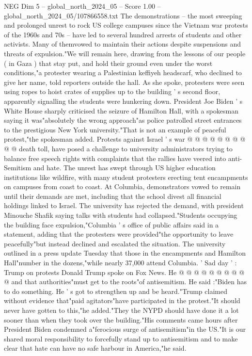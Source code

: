 \begin{textsample}{NEG Dim 5 – global\_north\_2024\_05 – Score 1.00 – global\_north\_2024\_05/107866558.txt}  \label{ex:f5_neg_285}
The demonstrations -- the most sweeping and prolonged unrest to rock US college campuses since the Vietnam war protests of the 1960s and 70s -- have led to several hundred arrests of students and other activists.
Many of themvowed to maintain their actions despite suspensions and threats of expulsion."We will remain here, drawing from the lessons of our people ( in Gaza ) that stay put, and hold their ground even under the worst conditions,"a protester wearing a Palestinian keffiyeh headscarf, who declined to give her name, told reporters outside the hall.
As she spoke, protesters were seen using ropes to hoist crates of supplies up to the building ' s second floor, apparently signalling the students were hunkering down.
President Joe Biden ' s White House sharply criticised the seizure of Hamilton Hall, with a spokesman saying it was"absolutely the wrong approach"as police patrolled street entrances to the prestigious New York university."That is not an example of peaceful protest,"the spokesman added.
Protests against Israel ' s war @ @ @ @ @ @ @ @ @ @ death toll, have posed a challenge to university administrators trying to balance free speech rights with complaints that the rallies have veered into anti-Semitism and hate.
The unrest has swept through US higher education institutions like wildfire, with many student protesters erecting tent encampments on campuses from coast to coast.
At Columbia, demonstrators vowed to remain until their demands are met, including that the school divest all financial holdings linked to Israel.
The university has rejected the demand, with president Minouche Shafik saying talks with students had collapsed."Students occupying the building face expulsion,"Columbia ' s office of public affairs said in a statement, adding that the protesters were provided"the opportunity to leave peacefully"but instead declined and escalated the situation.
The university outlined in a press update Tuesday that those in the encampments and Hamilton Hall"number in the dozens,"while nearly 37,000 attend Columbia. ' Sad day ' : Trump on protests Donald Trump spoke on Fox News.
He @ @ @ @ @ @ @ @ @ @ and that authorities"must get to the roots"of antisemitism.
He said :"Biden has to do something.
He ' s got to strengthen up and be heard."Trump claimed without evidence that"paid agitators"have participated in the protest."It should never have gotten to this,"he added."They the NYPD should have done it a lot sooner than when they took over the building."His comments came hours after President Biden condemned a"ferocious surge of antisemitism"in the US."It is our shared moral responsibility to forcefully stand up to antisemitism and to make clear that hate can have no safe harbour in America,"he said.

\end{textsample}
